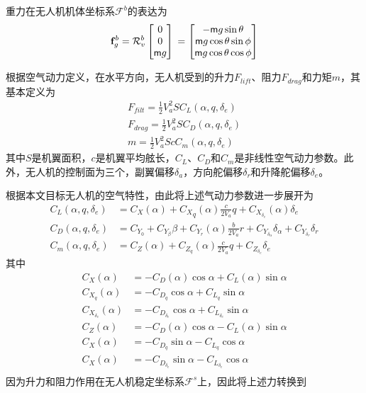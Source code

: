 重力在无人机机体坐标系$\mathcal{F}^b$的表达为
\begin{equation}
\mathbf{f}_g^b =\mathcal{R}^b_v \begin{bmatrix}0  \\ 0  \\ \mathsf{m}g  \end{bmatrix} \\
= \begin{bmatrix} -\mathsf{m} g \sin \theta  \\ \mathsf{m}g \cos \theta \sin \phi  \\ \mathsf{m}g \cos\theta \cos \phi  \end{bmatrix}
\end{equation}

根据空气动力定义，在水平方向，无人机受到的升力$F_{lift}$、阻力$F_{drag}$和力矩$m$，其基本定义为
\begin{align}
F_{filt} = \frac{1}{2} V_a^2SC_L(\alpha, q, \delta_e) \\
F_{drag} = \frac{1}{2} V_a^2SC_D(\alpha, q, \delta_e) \\
m = \frac{1}{2} V_a^2ScC_m(\alpha, q, \delta_e)
\end{align}
其中$S$是机翼面积，$c$是机翼平均舷长，$C_L$、$C_D$和$C_m$是非线性空气动力参数。此外，无人机的控制面为三个，副翼偏移$\delta_a$，方向舵偏移$\delta_r$和升降舵偏移$\delta_e$。

根据本文目标无人机的空气特性，由此将上述气动力参数进一步展开为
\begin{align}
C_L(\alpha, q, \delta_e) &= C_X(\alpha) + {C_X}_q(\alpha) \frac{c}{2V_a}  q+ C_{X_{{\delta}_e}}(\alpha) \delta_e \\
C_D(\alpha, q, \delta_e) &= C_{Y_{0}} + C_{Y_{\beta}} \beta + C_{Y_r}(\alpha) \frac{b}{2V_a} r+ C_{Y_{\delta_\alpha}} \delta_\alpha +  C_{Y_{\delta_r}} \delta_r  \\ 
C_m(\alpha, q, \delta_e) &= C_Z(\alpha) + C_{Z_q}(\alpha) \frac{c}{2V_a}  q+ C_{Z_{\delta_e}} \delta_e
\end{align}
其中
\begin{align}
C_X(\alpha) &= -C_D(\alpha) \cos \alpha +  C_L(\alpha) \sin \alpha \\
C_{X_q}(\alpha) &= -C_{D_q} \cos \alpha +  C_{L_q} \sin \alpha \\
C_{X_{\delta_e}}(\alpha) &= -C_{D_{\delta_e}} \cos \alpha +  C_{L_{\delta_e}} \sin \alpha \\
C_Z(\alpha) &= -C_D(\alpha) \cos \alpha -  C_L(\alpha) \sin \alpha \\
C_X(\alpha) &= -C_{D_q} \sin \alpha -  C_{L_q} \cos \alpha \\
C_X(\alpha) &= -C_{D_{\delta_e}}  \sin \alpha -  C_{L_{\delta_e}} \cos \alpha \\
\end{align}
因为升力和阻力作用在无人机稳定坐标系$\mathcal{F}^s$上，因此将上述力转换到


